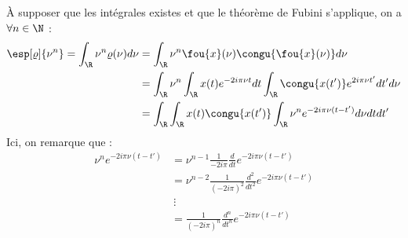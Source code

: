 \begin{demo}
	\`A supposer que les intégrales existes et que le théorème de Fubini s'applique, on a $\forall n\in\N$ :
	\begin{align*}
		\esp[\varrho]{\nu^n} = \int_\R \nu^n\varrho(\nu) d\nu &= \int_\R \nu^n \fou{x}(\nu)\congu{\fou{x}(\nu)} d\nu \\
		&= \int_\R \nu^n \int_\R x(t)e^{-2i \pi \nu t} dt \int_\R \congu{x(t')}e^{2i \pi \nu t'} dt' d\nu \\
		&= \int_\R \int_\R x(t) \congu{x(t')} \int_\R \nu^n e^{-2i \pi \nu (t-t')} d\nu dt dt' 
	\end{align*}
	Ici, on remarque que :
	\begin{align*}
		\nu^n e^{-2i \pi \nu (t-t')} &= \nu^{n-1}\frac{1}{-2i \pi}\frac{d}{dt}e^{-2i \pi \nu(t-t')} \\
		&= \nu^{n-2}\frac{1}{(-2i \pi)^2}\frac{d^2}{dt^2}e^{-2i \pi \nu(t-t')} \\
		&\ \vdots \\
		&= \frac{1}{(-2i \pi)^n}\frac{d^n}{dt^n}e^{-2i \pi \nu(t-t')}
	\end{align*}
	\\
	

\end{demo}
